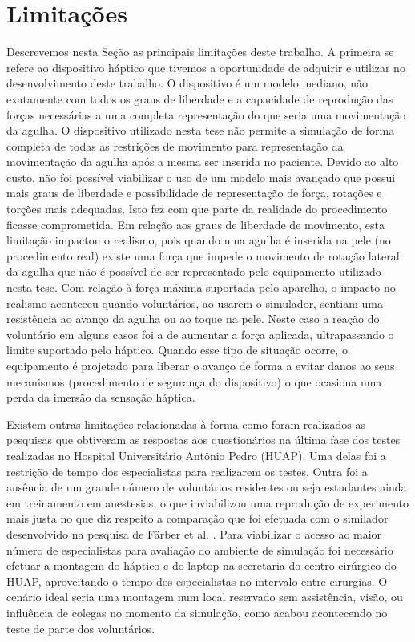 \section{Limitações}

Descrevemos nesta Seção as principais limitações deste trabalho. A primeira se refere ao dispositivo háptico que tivemos a oportunidade de adquirir e utilizar no desenvolvimento deste trabalho. O dispositivo é um modelo mediano, não exatamente com todos os graus de liberdade e a capacidade de reprodução das forças necessárias a uma completa representação do que seria uma movimentação da agulha. O dispositivo utilizado nesta tese não permite a simulação de forma completa de todas as restrições de movimento para representação da movimentação da agulha após a mesma ser inserida no paciente. Devido ao alto custo, não foi possível viabilizar o uso de um modelo mais avançado que possui mais graus de liberdade e possibilidade de representação de força, rotações e torções mais adequadas. Isto fez com que parte da realidade do procedimento ficasse comprometida. Em relação aos graus de liberdade de movimento, esta limitação impactou o realismo, pois quando uma agulha é inserida na pele (no procedimento real) existe uma força que impede o movimento de rotação lateral da agulha que não é possível de ser representado pelo equipamento utilizado nesta tese. Com relação à força máxima suportada pelo aparelho, o impacto no realismo aconteceu quando voluntários, ao usarem o simulador, sentiam uma resistência ao avanço da agulha ou ao toque na pele. Neste caso a reação do voluntário em alguns casos foi a de aumentar a força aplicada, ultrapassando o limite suportado pelo háptico. Quando esse tipo de situação ocorre, o equipamento é projetado para liberar o avanço de forma a evitar danos ao seus mecanismos (procedimento de segurança do dispositivo) o que ocasiona uma perda da imersão da sensação háptica.

Existem outras limitações relacionadas à forma como foram realizados as pesquisas que obtiveram as respostas aos questionários na última fase dos testes realizadas no Hospital Universitário Antônio Pedro (HUAP). Uma delas foi a restrição de tempo dos especialistas para realizarem os testes. Outra foi a ausência de um grande número de voluntários residentes ou seja estudantes ainda em treinamento em anestesias, o que inviabilizou uma reprodução de experimento mais justa no que diz respeito a comparação que foi efetuada com o similador desenvolvido na pesquisa de Färber et al. \cite{Farber2008}. Para viabilizar o acesso ao maior número de especialistas para avaliação do ambiente de simulação foi necessário efetuar a montagem do háptico e do laptop na secretaria do centro cirúrgico do HUAP, aproveitando o tempo dos especialistas no intervalo entre cirurgias. O cenário ideal seria uma montagem num local reservado sem assistência, visão, ou influência de colegas no momento da simulação, como acabou acontecendo no teste de parte dos voluntários. 

